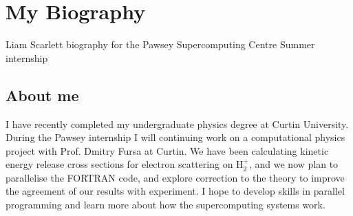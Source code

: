 \section{My Biography}
Liam Scarlett biography for the Pawsey Supercomputing Centre Summer internship
\subsection{About me}
I have recently completed my undergraduate physics degree at Curtin University. 
During the Pawsey internship I will continuing work on a computational physics project 
with Prof. Dmitry Fursa at Curtin. We have been calculating kinetic energy release
cross sections for electron scattering on H$_2^+$, and we now plan to parallelise the FORTRAN
code, and explore correction to the theory to improve the agreement of our results with
experiment. I hope to develop skills in parallel programming
and learn more about how the supercomputing systems work.   
